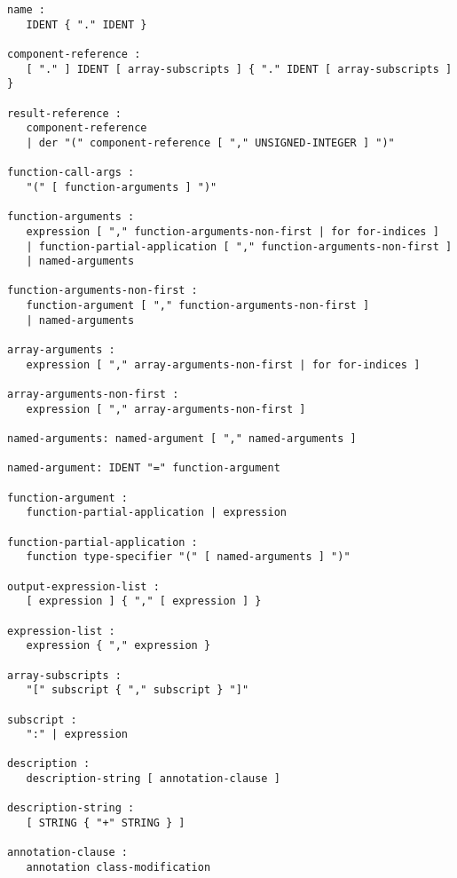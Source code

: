 \begin{lstlisting}[language=grammar]
name :
   IDENT { "." IDENT }

component-reference :
   [ "." ] IDENT [ array-subscripts ] { "." IDENT [ array-subscripts ] }

result-reference :
   component-reference
   | der "(" component-reference [ "," UNSIGNED-INTEGER ] ")"

function-call-args :
   "(" [ function-arguments ] ")"

function-arguments :
   expression [ "," function-arguments-non-first | for for-indices ]
   | function-partial-application [ "," function-arguments-non-first ]
   | named-arguments

function-arguments-non-first :
   function-argument [ "," function-arguments-non-first ]
   | named-arguments

array-arguments :
   expression [ "," array-arguments-non-first | for for-indices ]

array-arguments-non-first :
   expression [ "," array-arguments-non-first ]

named-arguments: named-argument [ "," named-arguments ]

named-argument: IDENT "=" function-argument

function-argument :
   function-partial-application | expression

function-partial-application :
   function type-specifier "(" [ named-arguments ] ")"

output-expression-list :
   [ expression ] { "," [ expression ] }

expression-list :
   expression { "," expression }

array-subscripts :
   "[" subscript { "," subscript } "]"

subscript :
   ":" | expression

description :
   description-string [ annotation-clause ]

description-string :
   [ STRING { "+" STRING } ]

annotation-clause :
   annotation class-modification
\end{lstlisting}

